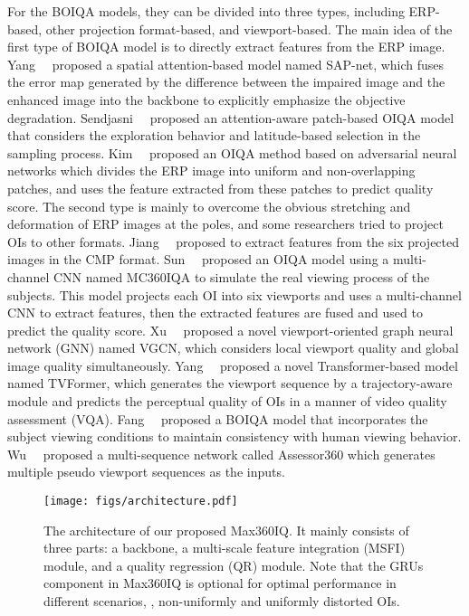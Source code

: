 For the BOIQA models, they can be divided into three types, including ERP-based, other projection format-based, and viewport-based. The main idea of the first type of BOIQA model is to directly extract features from the ERP image. Yang~\et~\cite{yang2021spatial} proposed a spatial attention-based model named SAP-net, which fuses the error map generated by the difference between the impaired image and the enhanced image into the backbone to 
explicitly emphasize the objective degradation. Sendjasni~\et~\cite{sendjasni2023attention} proposed an attention-aware patch-based OIQA model that considers the exploration behavior and latitude-based selection in the sampling process. Kim~\et~\cite{kim2017deep} proposed an OIQA method based on adversarial neural networks which divides the ERP image into uniform and non-overlapping patches, and uses the feature extracted from these patches to predict quality score. The second type is mainly to overcome the obvious stretching and deformation of ERP images at the poles, and some researchers tried to project OIs to other formats. Jiang~\et~\cite{jiang2021cubemap} proposed to extract features from the six projected images in the CMP format. Sun~\et~\cite{sun2019mc360iqa} proposed an OIQA model using a multi-channel CNN named MC360IQA to simulate the real viewing process of the subjects. This model projects each OI into six viewports and uses a multi-channel CNN to extract features, then the extracted features are fused and used to predict the quality score. 
Xu~\et~\cite{xu2020blind} proposed a novel viewport-oriented graph neural network (GNN) named VGCN, which considers local viewport quality and global image quality simultaneously. Yang~\et~\cite{yang2022tvformer} proposed a novel Transformer-based model named TVFormer, which generates the viewport sequence by a trajectory-aware module and predicts the perceptual quality of OIs in a manner of video quality assessment (VQA). Fang~\et~\cite{fang2022perceptual} proposed a BOIQA model that incorporates the subject viewing conditions to maintain consistency with human viewing behavior. Wu~\et~\cite{wu2024assessor360} proposed a multi-sequence network called Assessor360 which generates multiple pseudo viewport sequences as the inputs.


\begin{figure*}[]
\centering
\texttt{[image: figs/architecture.pdf]}
\caption{The architecture of our proposed Max360IQ. It mainly consists of three parts: a backbone, a multi-scale feature integration (MSFI) module, and a quality regression (QR) module. Note that the GRUs component in Max360IQ is optional for optimal performance in different scenarios, \ie, non-uniformly and uniformly distorted OIs.}
\label{fig:max360iq}
\end{figure*} 

